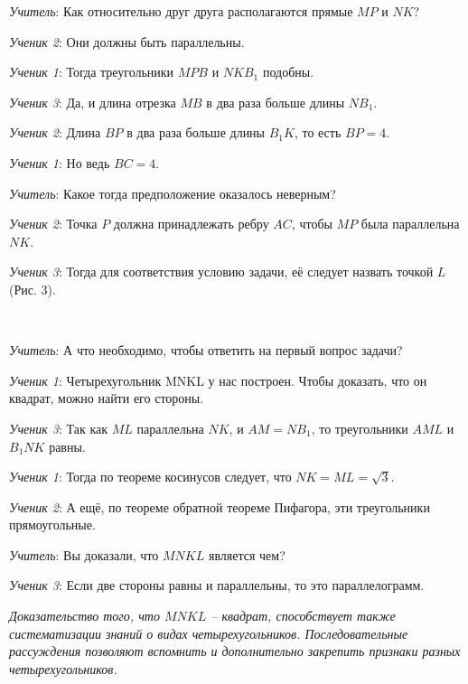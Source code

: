 \documentclass[a4paper,14pt,russian]{extreport}
\newcommand{\capt}[1]{%
    \\[8pt]
    \text{Рис. #1}
}
\begin{document}
\textit{Учитель}: Как относительно друг друга располагаются прямые $MP$ и $NK$?

\textit{Ученик 2}: Они должны быть параллельны.

\textit{Ученик 1}: Тогда треугольники $MPB$ и $NKB_1$ подобны.

\textit{Ученик 3}: Да, и длина отрезка $MB$ в два раза больше длины $NB_1$.

\textit{Ученик 2}: Длина $BP$ в два раза больше длины $B_1K$, то есть $BP=4$.

\textit{Ученик 1}: Но ведь $BC=4$.

\textit{Учитель}: Какое тогда предположение оказалось неверным?

\textit{Ученик 2}: Точка $P$ должна принадлежать ребру $AC$, чтобы $MP$ была параллельна $NK$. 

\textit{Ученик 3}: Тогда для соответствия условию задачи, её следует назвать точкой $L$ (Рис. 3).


\begin{center}
\hspace{-3.8cm}
    \begin{minipage}{0.3\textwidth}
        \centering
    \end{minipage}
    \capt{3}
\end{center}

\textit{Учитель}: А что необходимо, чтобы ответить на первый вопрос задачи?

\textit{Ученик 1}: Четырехугольник MNKL у нас построен. Чтобы доказать, что он квадрат, можно найти его стороны.

\textit{Ученик 3}: Так как $ML$ параллельна $NK$, и $AM=NB_1$, то треугольники $AML$ и $B_1NK$ равны.

\textit{Ученик 1}: Тогда по теореме косинусов следует, что $NK=ML=\sqrt{3}$.

\textit{Ученик 2}: А ещё, по теореме обратной теореме Пифагора, эти треугольники прямоугольные.

\textit{Учитель}: Вы доказали, что $MNKL$ является чем?

\textit{Ученик 3}: Если две стороны равны и параллельны, то это параллелограмм.

\textit{Доказательство того, что $MNKL$ – квадрат, способствует также систематизации знаний о видах четырехугольников. Последовательные рассуждения позволяют вспомнить и дополнительно закрепить признаки разных четырехугольников.}
\end{document}

